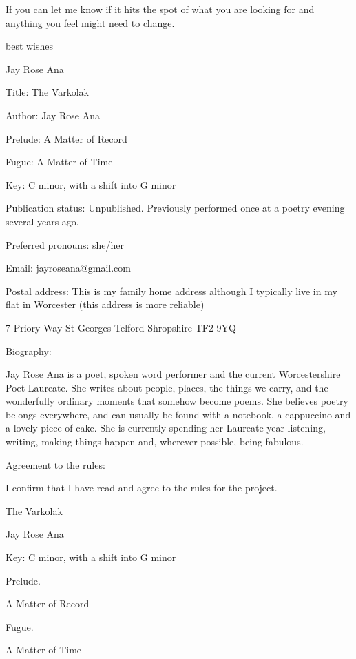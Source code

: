 If you can let me know if it hits the spot of what you are looking for
and anything you feel might need to change.

best wishes

Jay Rose Ana

Title: The Varkolak

Author: Jay Rose Ana

Prelude: A Matter of Record

Fugue: A Matter of Time

Key: C minor, with a shift into G minor

Publication status: Unpublished. Previously performed once at a poetry
evening several years ago.

Preferred pronouns: she/her

Email: jayroseana@gmail.com

Postal address: This is my family home address although I typically
live in my flat in Worcester (this address is more reliable)

7 Priory Way
St Georges
Telford
Shropshire
TF2 9YQ

Biography:

Jay Rose Ana is a poet, spoken word performer and the current
Worcestershire Poet Laureate. She writes about people, places, the
things we carry, and the wonderfully ordinary moments that somehow
become poems. She believes poetry belongs everywhere, and can usually
be found with a notebook, a cappuccino and a lovely piece of cake. She
is currently spending her Laureate year listening, writing, making
things happen and, wherever possible, being fabulous.

Agreement to the rules:

I confirm that I have read and agree to the rules for the project.


The Varkolak

Jay Rose Ana

Key: C minor, with a shift into G minor

Prelude.

A Matter of Record



Fugue.

A Matter of Time

 

 
